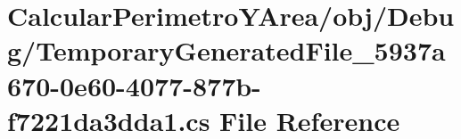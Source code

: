 \hypertarget{_temporary_generated_file__5937a670-0e60-4077-877b-f7221da3dda1_8cs}{}\section{Calcular\+Perimetro\+Y\+Area/obj/\+Debug/\+Temporary\+Generated\+File\+\_\+5937a670-\/0e60-\/4077-\/877b-\/f7221da3dda1.cs File Reference}
\label{_temporary_generated_file__5937a670-0e60-4077-877b-f7221da3dda1_8cs}
